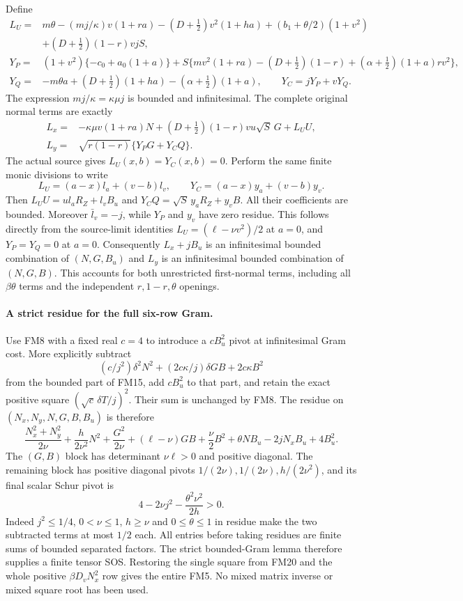 Define
\[
\begin{split}
 L_U={}&m\theta-(mj/\kappa)v(1+ra)
 -(D+\tfrac12)v^2(1+ha)+(b_1+\theta/2)(1+v^2)\\
       &+(D+\tfrac12)(1-r)vjS,\\
 Y_P={}&(1+v^2)\{-c_0+a_0(1+a)\}
       +S\{mv^2(1+ra)-(D+\tfrac12)(1-r)
                        +(\alpha+\tfrac12)(1+a)rv^2\},\\
 Y_Q={}&-m\theta a+(D+\tfrac12)(1+ha)
                                  -(\alpha+\tfrac12)(1+a),\qquad
 Y_C=jY_P+vY_Q.
\end{split}\tag{FM17}
\]
The expression $mj/\kappa=\kappa\mu j$ is bounded and
infinitesimal. The complete original normal terms are exactly
\[
\begin{split}
 L_x={}&-\kappa\mu v(1+ra)N
       +(D+\tfrac12)(1-r)vu\sqrt S\,G+L_UU,\\
 L_y={}&\sqrt{r(1-r)}\{Y_PG+Y_CQ\}.
\end{split}\tag{FM18}
\]
The actual source gives $L_U(x,b)=Y_C(x,b)=0$. Perform the same
finite monic divisions to write
\[
 L_U=(a-x)l_a+(v-b)l_v,\qquad
 Y_C=(a-x)y_a+(v-b)y_v.
 \tag{FM19}
\]
Then $L_UU=u l_aR_Z+l_vB_u$ and
$Y_CQ=\sqrt S\,y_aR_Z+y_vB$. All their coefficients are
bounded. Moreover $\bar l_v=-j$, while $Y_P$ and $y_v$ have
zero residue. This follows directly from the source-limit
identities
$L_U=(\ell-\nu v^2)/2$ at $a=0$, and
$Y_P=Y_Q=0$ at $a=0$.
Consequently $L_x+jB_u$ is an infinitesimal bounded combination
of $(N,G,B_u)$ and $L_y$ is an infinitesimal bounded combination
of $(N,G,B)$. This accounts for both unrestricted first-normal
terms, including all $\beta\theta$ terms and the independent
$r,1-r,\theta$ openings.

\paragraph{A strict residue for the full six-row Gram.}
Use FM8 with a fixed real $c=4$ to introduce a $cB_u^2$ pivot
at infinitesimal Gram cost. More explicitly subtract
\[
 (c/j^2)\delta^2N^2+(2c\kappa/j)\delta GB+2c\kappa B^2
 \tag{FM20}
\]
from the bounded part of FM15, add $cB_u^2$ to that part, and
retain the exact positive square $(\sqrt c\,\delta T/j)^2$.
Their sum is unchanged by FM8. The residue on
$(N_x,N_y,N,G,B,B_u)$ is therefore
\[
 \frac{N_x^2+N_y^2}{2\nu}+\frac h{2\nu^2}N^2
 +\frac{G^2}{2\nu}+(\ell-\nu)GB+\frac\nu2B^2
       +\theta NB_u-2jN_xB_u+4B_u^2.
 \tag{FM21}
\]
The $(G,B)$ block has determinant $\nu\ell>0$ and positive
diagonal. The remaining block has positive diagonal pivots
$1/(2\nu),1/(2\nu),h/(2\nu^2)$, and its final scalar Schur
pivot is
\[
 4-2\nu j^2-\frac{\theta^2\nu^2}{2h}>0.
 \tag{FM22}
\]
Indeed $j^2\le1/4$, $0<\nu\le1$, $h\ge\nu$ and
$0\le\theta\le1$ in residue make the two subtracted terms
at most $1/2$ each. All entries before taking residues are finite
sums of bounded separated factors. The strict
bounded-Gram lemma therefore supplies a finite tensor SOS.
Restoring the single square from FM20 and the whole positive
$\beta D_vN_x^2$ row gives the entire FM5. No mixed matrix inverse
or mixed square root has been used.


